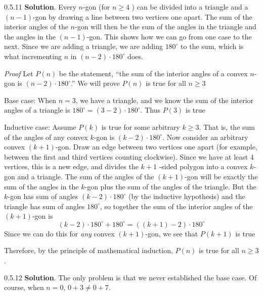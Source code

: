 \documentclass[11pt,]{book}
\makeatletter
\theoremstyle{ptxplainnotitle}
\theoremstyle{ptxplaintitle}
\renewcommand*{\proofname}{Proof}
\renewenvironment{proof}[1][\proofname]{\par
  \pushQED{\qed}%
  \normalfont \topsep6\p@\@plus6\p@\relax
  \trivlist
  \item\relax
    {\itshape
    #1\@addpunct{.}}\hspace\labelsep\ignorespaces
}{%
  \popQED\endtrivlist\@endpefalse
}
\theoremstyle{ptxdefinitionnotitle}
\theoremstyle{ptxdefinitiontitle}
\theoremstyle{ptxdefinitionnotitle}
\theoremstyle{ptxdefinitiontitle}
\theoremstyle{ptxdefinitionnotitle}
\theoremstyle{ptxdefinitiontitle}
\theoremstyle{ptxdefinitiontitlenonumber}
\theoremstyle{ptxdefinitiontitlenonumber}
\numberwithin{equation}{chapter}
\makeatother
\begin{document}
\begin{divisionexercise}{0.5.11}
\textbf{Solution}.\quad%
\hypertarget{p-652}{}%
Every \(n\)-gon (for \(n \ge 4\) ) can be divided into a triangle and a \((n-1)\)-gon by drawing a line between two vertices one apart.  The sum of the interior angles of the \(n\)-gon will then be the sum of the angles in the triangle and the angles in the \((n-1)\)-gon.  This shows how we can go from one case to the next.  Since we are adding a triangle, we are adding \(180^\circ\) to the sum, which is what incrementing \(n\) in \((n-2)\cdot 180^\circ\) does.%
\begin{proof}\hypertarget{proof-13}{}
\hypertarget{p-653}{}%
Let \(P(n)\) be the statement, ``the sum of the interior angles of a convex \(n\)-gon is \((n-2)\cdot 180^\circ\).''  We will prove \(P(n)\) is true for all \(n \ge 3\)%
\par
\hypertarget{p-654}{}%
Base case: When \(n=3\), we have a triangle, and we know the sum of the interior angles of a triangle is \(180^\circ = (3-2)\cdot 180^\circ\).  Thus \(P(3)\) is true%
\par
\hypertarget{p-655}{}%
Inductive case: Assume \(P(k)\) is true for some arbitrary \(k \ge 3\).  That is, the sum of the angles of any convex \(k\)-gon is \((k-2)\cdot 180^\circ\).  Now consider an arbitrary convex \((k+1)\)-gon.  Draw an edge between two vertices one apart (for example, between the first and third vertices counting clockwise).  Since we have at least 4 vertices, this is a new edge, and divides the \(k+1\) -sided polygon into a convex \(k\)-gon and a triangle.  The sum of the angles of the \((k+1)\)-gon will be exactly the sum of the angles in the \(k\)-gon plus the sum of the angles of the triangle.  But the \(k\)-gon has sum of angles \((k-2)\cdot 180^\circ\) (by the inductive hypothesis) and the triangle has sum of angles \(180^\circ\), so together the sum of the interior angles of the \((k+1)\)-gon is%
\begin{equation*}
(k-2)\cdot 180^\circ + 180^\circ = ((k+1)-2)\cdot 180^\circ
\end{equation*}
Since we can do this for \emph{any} convex \((k+1)\)-gon, we see that \(P(k+1)\) is true%
\par
\hypertarget{p-656}{}%
Therefore, by the principle of mathematical induction, \(P(n)\) is true for all \(n\ge 3\).%
\end{proof}
\end{divisionexercise}%
\begin{divisionexercise}{0.5.12}
\textbf{Solution}.\quad%
\hypertarget{p-659}{}%
The only problem is that we never established the base case. Of course, when \(n = 0\), \(0+3 \ne 0+7\).%
\end{divisionexercise}%
\end{document}
